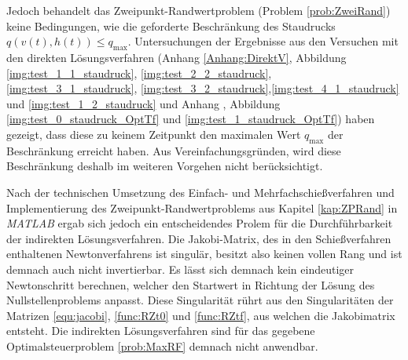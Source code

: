Jedoch behandelt das Zweipunkt-Randwertproblem (Problem \ref{prob:ZweiRand}) keine Bedingungen, wie die geforderte Beschränkung des Staudrucks $q(v(t),h(t)) \leq q_{\max}$. Untersuchungen der Ergebnisse aus den Versuchen mit den direkten Lösungsverfahren (Anhang \ref{Anhang:DirektV}, Abbildung \ref{img:test_1_1_staudruck}, \ref{img:test_2_2_staudruck}, \ref{img:test_3_1_staudruck}, \ref{img:test_3_2_staudruck},\ref{img:test_4_1_staudruck} und \ref{img:test_1_2_staudruck} und Anhang \label{kap:OptTf}, Abbildung \ref{img:test_0_staudruck_OptTf} und \ref{img:test_1_staudruck_OptTf}) haben gezeigt, dass diese zu keinem Zeitpunkt den maximalen Wert $q_{\max}$ der Beschränkung erreicht haben. Aus Vereinfachungsgründen, wird diese Beschränkung deshalb im weiteren Vorgehen nicht berücksichtigt.

Nach der technischen Umsetzung des Einfach- und Mehrfachschießverfahren und Implementierung des Zweipunkt-Randwertproblems aus Kapitel \ref{kap:ZPRand} in \textit{MATLAB} ergab sich jedoch ein entscheidendes Prolem für die Durchführbarkeit der indirekten Lösungsverfahren. Die Jakobi-Matrix, des in den Schießverfahren enthaltenen Newtonverfahrens ist singulär, besitzt also keinen vollen Rang und ist demnach auch nicht invertierbar. Es lässt sich demnach kein eindeutiger Newtonschritt berechnen, welcher den Startwert in Richtung der Lösung des Nullstellenproblems anpasst. Diese Singularität rührt aus den Singularitäten der Matrizen \ref{equ:jacobi}, \ref{func:RZt0} und \ref{func:RZtf}, aus welchen die Jakobimatrix entsteht. Die indirekten Lösungsverfahren sind für das gegebene Optimalsteuerproblem \ref{prob:MaxRF} demnach nicht anwendbar.
